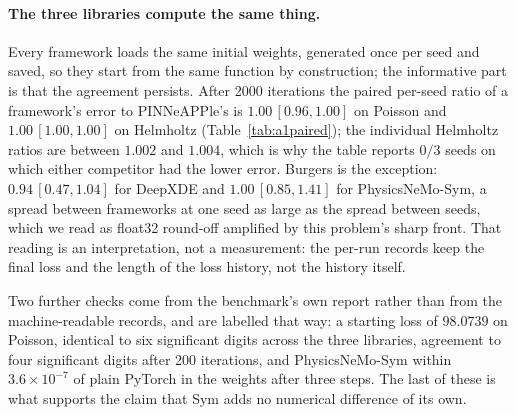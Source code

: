 \documentclass[11pt]{article}
\newcommand{\fit}[1]{\resizebox{\ifdim\width>\linewidth\linewidth\else\width\fi}{!}{#1}}
\begin{document}
\paragraph{The three libraries compute the same thing.} Every framework loads the same initial
weights, generated once per seed and saved, so they start from the same function by construction;
the informative part is that the agreement persists. After 2000 iterations the paired per-seed ratio
of a framework's error to PINNeAPPle's is $1.00\,[0.96,1.00]$ on Poisson and $1.00\,[1.00,1.00]$ on
Helmholtz (Table~\ref{tab:a1paired}); the individual Helmholtz ratios are between $1.002$ and
$1.004$, which is why the table reports $0/3$ seeds on which either competitor had the lower error.
Burgers is the exception: $0.94\,[0.47,1.04]$ for DeepXDE and $1.00\,[0.85,1.41]$ for
PhysicsNeMo-Sym, a spread between frameworks at one seed as large as the spread between seeds, which
we read as float32 round-off amplified by this problem's sharp front. That reading is an
interpretation, not a measurement: the per-run records keep the final loss and the length of the
loss history, not the history itself.

Two further checks come from the benchmark's own report rather than from the machine-readable
records, and are labelled that way: a starting loss of $98.0739$ on Poisson, identical to six
significant digits across the three libraries, agreement to four significant digits after 200
iterations, and PhysicsNeMo-Sym within $3.6\times10^{-7}$ of plain PyTorch in the weights after
three steps. The last of these is what supports the claim that Sym adds no numerical difference of
its own.

\begin{table}[t]
\centering\small
\fit{}
\caption{Track~A1: paired per-seed ratio of each framework's relative $L^2$ to PINNeAPPle's, median
[min, max], and the number of seeds on which the framework's error was the lower of the two.}
\label{tab:a1paired}
\end{table}
\end{document}
